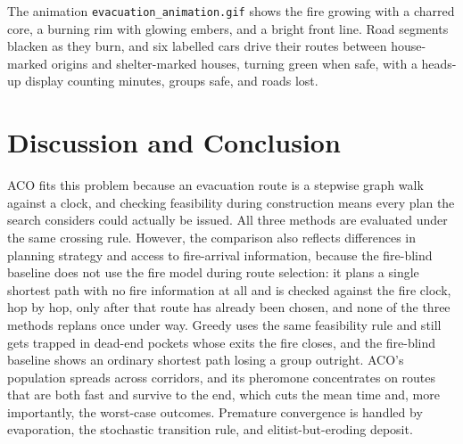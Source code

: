 \documentclass[11pt,a4paper]{article}
\begin{document}
\noindent The animation \texttt{evacuation\_animation.gif} shows the fire growing with a charred core, a burning rim with glowing embers, and a bright front line. Road segments blacken as they burn, and six labelled cars drive their routes between house-marked origins and shelter-marked houses, turning green when safe, with a heads-up display counting minutes, groups safe, and roads lost.

\section{Discussion and Conclusion}

ACO fits this problem because an evacuation route is a stepwise graph walk against a clock, and checking feasibility during construction means every plan the search considers could actually be issued. All three methods are evaluated under the same crossing rule. However, the comparison also reflects differences in planning strategy and access to fire-arrival information, because the fire-blind baseline does not use the fire model during route selection: it plans a single shortest path with no fire information at all and is checked against the fire clock, hop by hop, only after that route has already been chosen, and none of the three methods replans once under way. Greedy uses the same feasibility rule and still gets trapped in dead-end pockets whose exits the fire closes, and the fire-blind baseline shows an ordinary shortest path losing a group outright. ACO's population spreads across corridors, and its pheromone concentrates on routes that are both fast and survive to the end, which cuts the mean time and, more importantly, the worst-case outcomes. Premature convergence is handled by evaporation, the stochastic transition rule, and elitist-but-eroding deposit.

\end{document}
